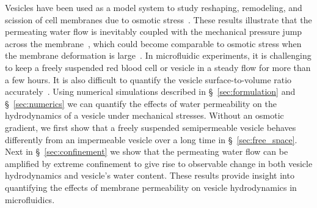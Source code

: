 \documentclass[prb,preprint,showpacs,preprintnumbers,amsmath,amssymb,longbibliography]{revtex4-1}
\begin{document}
Vesicles 
have been used as a
model system to study reshaping, remodeling, and scission of cell
membranes due to osmotic stress~\cite{OgleckaEtAl2014_eLife, BhatiaRobinsonDimova2020_SoftMatt,
CamposSaric2020_bioRxiv, Dimova2020_GVB, BhatiaChrist2020_SoftMatt}.
These results illustrate that the permeating water
flow is inevitably coupled with the mechanical pressure jump across the
membrane~\cite{yao-mor2017}, which could become comparable to osmotic
stress when the membrane deformation is large~\cite{LiMoriSun2015_PRL,
yao-mor2017}. 
%
In microfluidic experiments, it is challenging to keep a freely
suspended red blood cell or vesicle in a steady flow for more than a few
hours. It is also difficult to quantify the vesicle surface-to-volume
ratio accurately~\cite{MinetttiCallensCoupier2008_AppliedOptics}. Using
numerical simulations described in \S~\ref{sec:formulation} and
\S~\ref{sec:numerics} we can quantify the effects of water permeability
on the hydrodynamics of a vesicle under mechanical stresses.  Without an
osmotic gradient, we first show that a freely suspended semipermeable
vesicle behaves differently from an impermeable vesicle over a long time
in \S~\ref{sec:free_space}. Next in \S~\ref{sec:confinement} we show
that
the permeating water flow can be amplified by extreme confinement to give rise to observable change in both  vesicle hydrodynamics and vesicle's water content. 
These results provide insight into quantifying the effects of membrane permeability on vesicle hydrodynamics in microfluidics.
%
 
\end{document}
